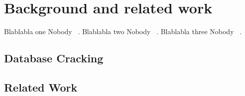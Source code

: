 \section{Background and related work}
\label{sec:background}
Blablabla one Nobody ~\cite{schuhknecht_2014}.
Blablabla two Nobody ~\cite{idreos_2007}.
Blablabla three Nobody ~\cite{kersten_2005}.
\subsection{Database Cracking}
\subsection{Related Work}
